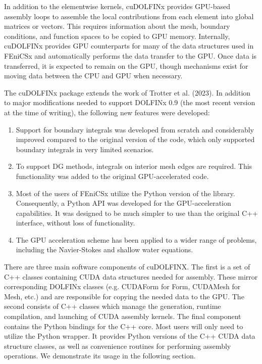 In addition to the elementwise kernels, cuDOLFINx provides GPU-based assembly loops to assemble the local contributions from each element into global matrices or vectors. This requires information about the mesh, boundary conditions, and function spaces to be copied to GPU memory. Internally, cuDOLFINx provides GPU counterparts for many of the data structures used in FEniCSx and automatically performs the data transfer to the GPU. Once data is transferred, it is expected to remain on the GPU, though mechanisms exist for moving data between the CPU and GPU when necessary.

The cuDOLFINx package extends the work of Trotter et al. (2023). In addition to major modifications needed to support DOLFINx 0.9 (the most recent version at the time of writing), the following new features were developed:
\begin{enumerate}
    \item Support for boundary integrals was developed from scratch and considerably improved compared to the original version of the code, which only supported boundary integrals in very limited scenarios.
    \item To support DG methods, integrals on interior mesh edges are required. This functionality was added to the original GPU-accelerated code.
    \item Most of the users of FEniCSx utilize the Python version of the library. Consequently, a Python API was developed for the GPU-acceleration capabilities. It was designed to be much simpler to use than the original C++ interface, without loss of functionality.
    \item The GPU acceleration scheme has been applied to a wider range of problems, including the Navier-Stokes and shallow water equations.
\end{enumerate}

There are three main software components of cuDOLFINX. The first is a set of C++ classes containing CUDA data structures needed for assembly. These mirror corresponding DOLFINx classes (e.g. CUDAForm for Form, CUDAMesh for Mesh, etc.) and are responsible for copying the needed data to the GPU. The second consists of C++ classes which manage the generation, runtime compilation, and launching of CUDA assembly kernels. The final component contains the Python bindings for the C++ core. Most users will only need to utilize the Python wrapper. It provides Python versions of the C++ CUDA data structure classes, as well as convenience routines for performing assembly operations. We demonstrate its usage in the following section.

